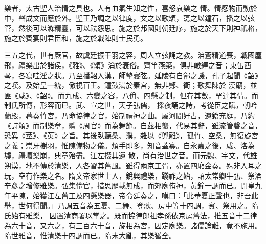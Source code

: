 
\begin{pinyinscope}

 樂者，太古聖人治情之具也。人有血氣生知之性，喜怒哀樂之
 情。情感物而動於中，聲成文而應於外。聖王乃調之以律度，文之以歌頌，蕩之以鐘石，播之以弦管，然後可以滌精靈，可以祛怨思。施之於邦國則朝廷序，施之於天下則神祇格，施之於賓宴則君臣和，施之於戰陣則士民勇。



 三五之代，世有厥官，故虞廷振干羽之容，周人立弦誦之教。洎蒼精道喪，戰國塵飛，禮樂出於諸侯，《雅》、《頌》淪於衰俗。齊竽燕築，俱非皦繹之音；東缶西琴，各寫哇淫之狀。乃至播鞀入漢，師摯寢弦。延陵有自鄶之譏，孔子起聞《韶》之嘆。及始皇一統，傲視百王。鐘鼓滿於秦宮，無非鄭、衛；歌舞陳於
 漢廟，並匪《咸》、《韶》。而九成、六變之容，八佾、四懸之制，但存其數，罕達其情。而制氏所傳，形容而已。武、宣之世，天子弘儒，
 採夜誦之詩，考從臣之賦，朝吟蘭殿，暮奏竹宮，乃命協律之官，始制禮神之曲。屬河間好古，遺籍充庭，乃約《詩頌》而制樂章，體《周官》而為舞節。自茲相襲，代易其辭，雖流管磬之音，恐異《莖》、《英》之旨。其後臥聽桑、濮，雜以《兜離》，孤竹、空桑，無復旋宮之義；崇牙樹羽，惟陳備物之儀。煩手即多，知音蓋寡。自永嘉之後，咸、洛為墟，禮壞樂崩，典章殆盡。江左掇其遺
 散，尚有治世之音。而元魏、宇文，代雄朔漠，地不傳於清樂，人各習其舊風。雖得兩京工胥，亦置四廂金奏。殊非入耳之玩，空有作樂之名。隋文帝家世士人，銳興禮樂，踐祚之始，詔太常卿牛弘、祭酒辛彥之增修雅樂。弘集伶官，措思歷載無成，而郊廟侑神，黃鐘一調而已。開皇九年平陳，始獲江左舊工及四懸樂器，帝令廷奏之，嘆曰：「此華夏正聲也，非吾此舉，世何得聞。」乃調五音為五夏、二舞、登歌、房中等十四調，賓、祭用之。隋氏始有雅樂，
 因置清商署以掌之。既而協律郎祖孝孫依京房舊法，推五音十二律為六十音，又六之，有三百六十音，旋相為宮，因定廟樂。諸儒論難，竟不施用。隋世雅音，惟清樂十四調而已。隋末大亂，其樂猶全。




\end{pinyinscope}

